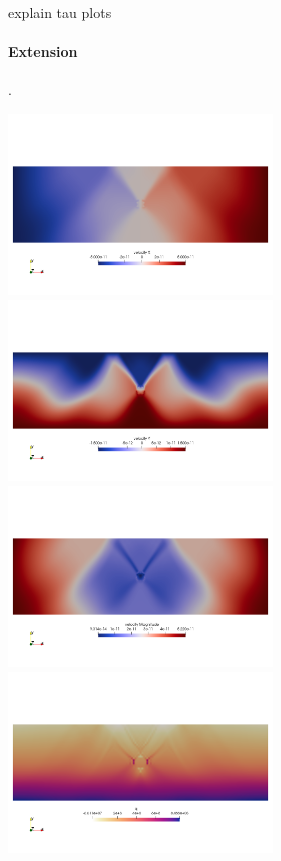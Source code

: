 explain tau plots

\newpage
\paragraph{Extension}.

\begin{center}
\includegraphics[width=7cm]{python_codes/fieldstone_70/extension/u}
\includegraphics[width=7cm]{python_codes/fieldstone_70/extension/v}\\
\includegraphics[width=7cm]{python_codes/fieldstone_70/extension/vel}
\includegraphics[width=7cm]{python_codes/fieldstone_70/extension/q}\\

\end{center}
